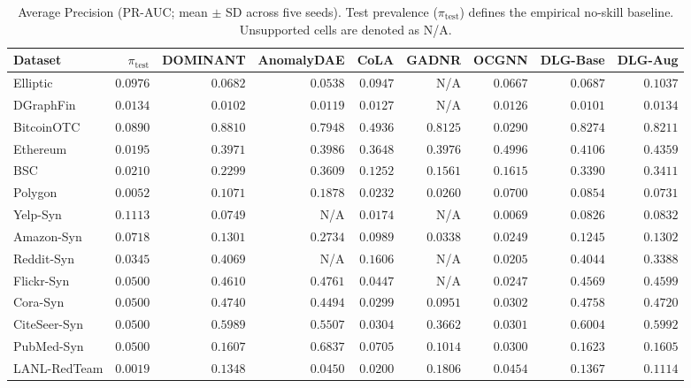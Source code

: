 \documentclass[applsci,article,submit,moreauthors,pdftex]{Definitions/mdpi}
\begin{document}
\begin{table}[htbp]
\centering\small\setlength{\tabcolsep}{3.5pt}
\caption{Average Precision (PR-AUC; mean $\pm$ SD across five seeds). Test prevalence ($\pi_{\mathrm{test}}$) defines the empirical no-skill baseline. Unsupported cells are denoted as N/A.}
\label{tab:pr_auc_main}
\begin{tabularx}{\textwidth}{lrrrrrrrr}\toprule
\textbf{Dataset} & $\pi_{\mathrm{test}}$ & \textbf{DOMINANT} & \textbf{AnomalyDAE} & \textbf{CoLA} & \textbf{GADNR} & \textbf{OCGNN} & \textbf{DLG-Base} & \textbf{DLG-Aug} \\\midrule
Elliptic & $0.0976$ & $0.0682$ & $0.0538$ & $0.0947$ & N/A & $0.0667$ & $0.0687$ & $\mathbf{0.1037}$ \\
DGraphFin & $0.0134$ & $0.0102$ & $0.0119$ & $0.0127$ & N/A & $0.0126$ & $0.0101$ & $\mathbf{0.0134}$ \\
BitcoinOTC & $0.0890$ & $\mathbf{0.8810}$ & $0.7948$ & $0.4936$ & $0.8125$ & $0.0290$ & $0.8274$ & $0.8211$ \\
Ethereum & $0.0195$ & $0.3971$ & $0.3986$ & $0.3648$ & $0.3976$ & $\mathbf{0.4996}$ & $0.4106$ & $0.4359$ \\
BSC & $0.0210$ & $0.2299$ & $\mathbf{0.3609}$ & $0.1252$ & $0.1561$ & $0.1615$ & $0.3390$ & $0.3411$ \\
Polygon & $0.0052$ & $0.1071$ & $\mathbf{0.1878}$ & $0.0232$ & $0.0260$ & $0.0700$ & $0.0854$ & $0.0731$ \\
Yelp-Syn & $0.1113$ & $0.0749$ & N/A & $0.0174$ & N/A & $0.0069$ & $0.0826$ & $\mathbf{0.0832}$ \\
Amazon-Syn & $0.0718$ & $0.1301$ & $\mathbf{0.2734}$ & $0.0989$ & $0.0338$ & $0.0249$ & $0.1245$ & $0.1302$ \\
Reddit-Syn & $0.0345$ & $\mathbf{0.4069}$ & N/A & $0.1606$ & N/A & $0.0205$ & $0.4044$ & $0.3388$ \\
Flickr-Syn & $0.0500$ & $0.4610$ & $\mathbf{0.4761}$ & $0.0447$ & N/A & $0.0247$ & $0.4569$ & $0.4599$ \\
Cora-Syn & $0.0500$ & $0.4740$ & $0.4494$ & $0.0299$ & $0.0951$ & $0.0302$ & $\mathbf{0.4758}$ & $0.4720$ \\
CiteSeer-Syn & $0.0500$ & $0.5989$ & $0.5507$ & $0.0304$ & $0.3662$ & $0.0301$ & $\mathbf{0.6004}$ & $0.5992$ \\
PubMed-Syn & $0.0500$ & $0.1607$ & $\mathbf{0.6837}$ & $0.0705$ & $0.1014$ & $0.0300$ & $0.1623$ & $0.1605$ \\\midrule
LANL-RedTeam & $0.0019$ & $0.1348$ & $0.0450$ & $0.0200$ & $\mathbf{0.1806}$ & $0.0454$ & $0.1367$ & $0.1114$ \\\bottomrule
\end{tabularx}
\end{table}
\end{document}
